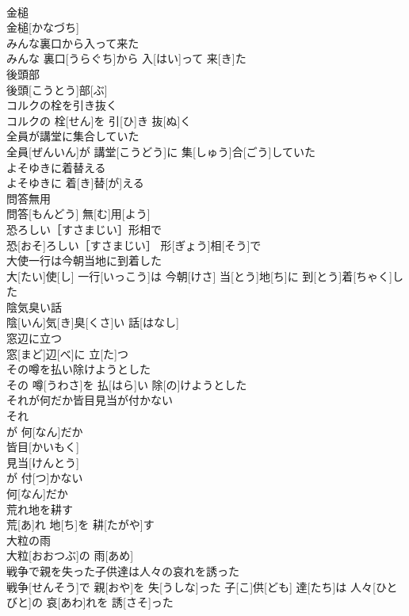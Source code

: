 \documentclass[8pt]{extreport}
\begin{document}
\begin{CJK}{UTF8}{min}
\\	金槌	
\\	金槌[かなづち]
\\	みんな裏口から入って来た	
\\	みんな 裏口[うらぐち]から 入[はい]って 来[き]た
\\	後頭部	
\\	後頭[こうとう]部[ぶ]
\\	コルクの栓を引き抜く	
\\	コルクの 栓[せん]を 引[ひ]き 抜[ぬ]く
\\	全員が講堂に集合していた	
\\	全員[ぜんいん]が 講堂[こうどう]に 集[しゅう]合[ごう]していた
\\	よそゆきに着替える	
\\	よそゆきに 着[き]替[が]える
\\	問答無用	
\\	問答[もんどう] 無[む]用[よう]
\\	恐ろしい［すさまじい］形相で	
\\	恐[おそ]ろしい［すさまじい］ 形[ぎょう]相[そう]で
\\	大使一行は今朝当地に到着した	
\\	大[たい]使[し] 一行[いっこう]は 今朝[けさ] 当[とう]地[ち]に 到[とう]着[ちゃく]した
\\	陰気臭い話	
\\	陰[いん]気[き]臭[くさ]い 話[はなし]
\\	窓辺に立つ	
\\	窓[まど]辺[べ]に 立[た]つ
\\	その噂を払い除けようとした	
\\	その 噂[うわさ]を 払[はら]い 除[の]けようとした
\\	それが何だか皆目見当が付かない	
\\	それ 
\\	が 何[なん]だか 
\\	皆目[かいもく]
\\	見当[けんとう]
\\	が 付[つ]かない 
\\	何[なん]だか 
\\	荒れ地を耕す	
\\	荒[あ]れ 地[ち]を 耕[たがや]す
\\	大粒の雨	
\\	大粒[おおつぶ]の 雨[あめ]
\\	戦争で親を失った子供達は人々の哀れを誘った	
\\	戦争[せんそう]で 親[おや]を 失[うしな]った 子[こ]供[ども] 達[たち]は 人々[ひとびと]の 哀[あわ]れを 誘[さそ]った

\end{CJK}
\end{document}
